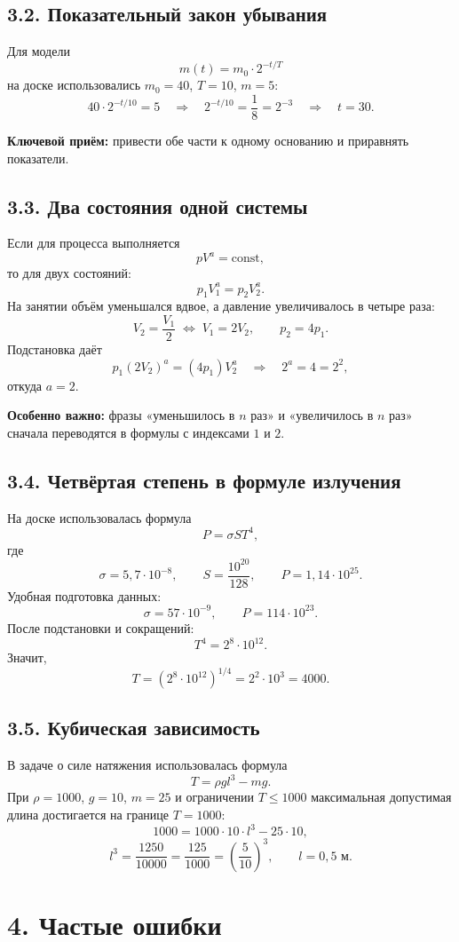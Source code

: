\documentclass[a4paper,12pt]{article}
\newcommand{\formula}[1]{\[\displaystyle #1\]}
\begin{document}
\subsection*{3.2. Показательный закон убывания}
Для модели
\formula{m(t)=m_0\cdot2^{-t/T}}
на доске использовались $m_0=40$, $T=10$, $m=5$:
\formula{40\cdot2^{-t/10}=5\quad\Longrightarrow\quad
2^{-t/10}=\frac18=2^{-3}\quad\Longrightarrow\quad t=30.}

\textbf{Ключевой приём:} привести обе части к одному основанию и приравнять показатели.

\subsection*{3.3. Два состояния одной системы}
Если для процесса выполняется
\formula{pV^a=\mathrm{const},}
то для двух состояний:
\formula{p_1V_1^a=p_2V_2^a.}
На занятии объём уменьшался вдвое, а давление увеличивалось в четыре раза:
\formula{V_2=\frac{V_1}{2}\;\Longleftrightarrow\;V_1=2V_2,\qquad p_2=4p_1.}
Подстановка даёт
\formula{p_1(2V_2)^a=(4p_1)V_2^a\quad\Longrightarrow\quad2^a=4=2^2,}
откуда $a=2$.

\textbf{Особенно важно:} фразы «уменьшилось в $n$ раз» и «увеличилось в $n$ раз» сначала переводятся в формулы с индексами $1$ и $2$.

\subsection*{3.4. Четвёртая степень в формуле излучения}
На доске использовалась формула
\formula{P=\sigma ST^4,}
где
\formula{\sigma=5{,}7\cdot10^{-8},\qquad S=\frac{10^{20}}{128},\qquad P=1{,}14\cdot10^{25}.}
Удобная подготовка данных:
\formula{\sigma=57\cdot10^{-9},\qquad P=114\cdot10^{23}.}
После подстановки и сокращений:
\formula{T^4=2^8\cdot10^{12}.}
Значит,
\formula{T=\left(2^8\cdot10^{12}\right)^{1/4}=2^2\cdot10^3=4000.}

\subsection*{3.5. Кубическая зависимость}
В задаче о силе натяжения использовалась формула
\formula{T=\rho g l^3-mg.}
При $\rho=1000$, $g=10$, $m=25$ и ограничении $T\le1000$ максимальная допустимая длина достигается на границе $T=1000$:
\formula{1000=1000\cdot10\cdot l^3-25\cdot10,}
\formula{l^3=\frac{1250}{10000}=\frac{125}{1000}=\left(\frac5{10}\right)^3,\qquad l=0{,}5\text{ м}.}

\section*{4. Частые ошибки}
\end{document}
